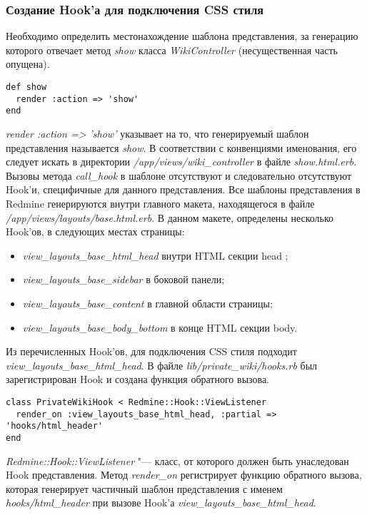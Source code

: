 \subsubsection{Создание Hook'а для подключения CSS стиля}
Необходимо определить местонахождение шаблона представления, за генерацию
которого отвечает метод \textit{show} класса \textit{WikiController}
(несущественная часть опущена).
\small{\begin{lstlisting}
def show
  render :action => 'show'
end
\end{lstlisting}}
\textit{render :action => 'show'} указывает на то, что генерируемый шаблон
представления называется \textit{show}. В соответствии с конвенциями
именования, его следует искать в директории
\textit{/app/views/wiki\_controller} в файле \textit{show.html.erb}.
Вызовы метода \textit{call\_hook} в шаблоне отсутствуют и следовательно
отсутствуют Hook'и, специфичные для данного представления. Все шаблоны
представления в Redmine генерируются внутри главного макета, находящегося в
файле \textit{/app/views/layouts/base.html.erb}. В данном макете, определены
несколько Hook'ов, в следующих местах страницы:
\begin{itemize}
  \item \textit{view\_layouts\_base\_html\_head} внутри HTML секции head ;
  \item \textit{view\_layouts\_base\_sidebar} в боковой панели;
  \item \textit{view\_layouts\_base\_content} в главной области страницы; 
  \item \textit{view\_layouts\_base\_body\_bottom} в конце HTML секции body.
\end{itemize}
Из перечисленных Hook'ов, для подключения CSS стиля подходит
\textit{view\_layouts\_base\_html\_head}. В файле
\textit{lib/private\_wiki/hooks.rb} был зарегистрирован Hook и создана функция
обратного вызова.
\small{\begin{lstlisting}
class PrivateWikiHook < Redmine::Hook::ViewListener
  render_on :view_layouts_base_html_head, :partial => 'hooks/html_header'
end
\end{lstlisting}}
\textit{Redmine::Hook::ViewListener} "--- класс, от которого должен быть
унаследован Hook представления. Метод \textit{render\_on} регистрирует функцию
обратного вызова, которая генерирует частичный шаблон представления с именем
\textit{hooks/html\_header} при вызове Hook'а
\textit{view\_layouts\_base\_html\_head}.

